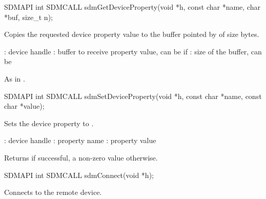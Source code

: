 \documentclass[a4paper,12pt,twoside,extrafontsizes]{memoir}
\begin{document}
\begin{cfuncprototype}
SDMAPI int SDMCALL sdmGetDeviceProperty(void *h, const char *name, char *buf, size_t n);
\end{cfuncprototype}

\begin{funcdescr}
	Copies the requested device property value to the buffer pointed by  of size  bytes.
\end{funcdescr}

\begin{funcparams}
	: device handle
	: buffer to receive property value, can be  if 
	: size of the buffer, can be 
\end{funcparams}

\begin{funcret}
	As in .
\end{funcret}



\begin{cfuncprototype}
SDMAPI int SDMCALL sdmSetDeviceProperty(void *h, const char *name, const char *value);
\end{cfuncprototype}

\begin{funcdescr}
	Sets the device property  to .
\end{funcdescr}

\begin{funcparams}
	: device handle
	: property name
	: property value
\end{funcparams}

\begin{funcret}
	Returns  if successful, a non-zero value otherwise.
\end{funcret}



\begin{cfuncprototype}
SDMAPI int SDMCALL sdmConnect(void *h);
\end{cfuncprototype}

\begin{funcdescr}
	Connects to the remote device.
\end{funcdescr}
\end{document}
